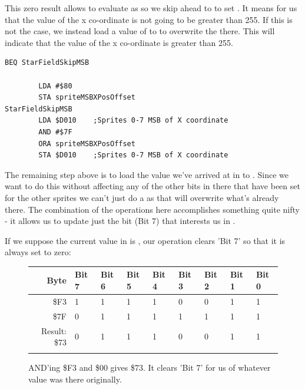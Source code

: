 This zero result allows  to evaluate as  so we skip ahead to 
to set .
It means for us that the value of the x co-ordinate is not going to be greater than 255. If this is not the case, we instead load a value of
 to  to overwrite the  there. This will indicate that the value of the x co-ordinate
is greater than 255.

\begin{lstlisting}[basicstyle=\tiny]
        BEQ StarFieldSkipMSB

        LDA #$80
        STA spriteMSBXPosOffset
StarFieldSkipMSB   
        LDA $D010    ;Sprites 0-7 MSB of X coordinate
        AND #$7F
        ORA spriteMSBXPosOffset
        STA $D010    ;Sprites 0-7 MSB of X coordinate
\end{lstlisting}

The remaining step above is to load the value we've arrived at in  to . Since we
want to do this without affecting any of the other bits in there that have been set for the other sprites we can't
just do a  as that will overwrite what's already there. The combination of the  operations
here accomplishes something quite nifty - it allows us to update just the bit (Bit 7) that interests us in .

If we suppose the current value in  is , our  operation clears 'Bit 7' so that
it is always set to zero:

\begin{figure}[H]
  {
    \setlength{\tabcolsep}{3.0pt}
    \setlength\cmidrulewidth{\heavyrulewidth} %
    \begin{adjustbox}{width=10cm,center}

      \begin{tabular}{rllllllll}
        \toprule
        Byte & Bit 7 & Bit 6 & Bit 5 & Bit 4 & Bit 3 & Bit 2 & Bit 1 & Bit 0        \\
        \midrule
        \$F3 & 1 & 1 & 1 & 1 & 0 & 0 & 1 & 1 \\
        \$7F & 0 & 1 & 1 & 1 & 1 & 1 & 1 & 1 \\
        \midrule
        Result: \$73 & 0 & 1 & 1 & 1 & 0 & 0 & 1 & 1 \\
        \addlinespace
        \bottomrule
      \end{tabular}
    \end{adjustbox}
  }\caption*{AND'ing \$F3 and \$00 gives \$73. It clears 'Bit 7' for us of whatever value was there originally.}
\end{figure}

